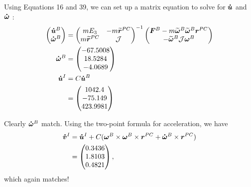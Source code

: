 \documentclass[12pt]{article}
\begin{document}
\begin{problem}[5]
Using Equations 16 and 39, we can set up a matrix equation to solve for $ {\bm{ \dot{u}}} $ and $ {\bm{ \dot{\omega}}} $ :
\begin{align*}
	\begin{pmatrix} {\bm{ \dot{u}}}^{B}\\ {\bm{ \dot{\omega}}}^{B}   \end{pmatrix} &= \begin{pmatrix} m E_3& -m {\bm{ \widetilde{ r}}}^{PC} \\ m {\bm{ \widetilde{ r}}}^{PC} & \mathcal{ J}  \end{pmatrix}^{-1} \begin{pmatrix} {\bm{ F}}^{B} - m {\bm{ \widetilde{ \omega}}}^{B} {\bm{ \widetilde{ \omega}}}^{B} {\bm{ r}}^{PC} \\ - {\bm{ \widetilde{ \omega}}}^{B} \mathcal{ J} {\bm{ \omega}}^{B}     \end{pmatrix}   \\ 
	{\bm{ \dot{\omega}}}^{B} &= \begin{pmatrix} -67.5008\\18.5284\\-4.0689 \end{pmatrix}  \\ 
	{\bm{ \dot{u}}}^{I} &= C {\bm{ \dot{u}}}^{B}  \\
	&= \begin{pmatrix} 1042.4\\-75.149\\423.9981 \end{pmatrix}  
\end{align*}
\end{problem}

\begin{problem}[6]
Clearly $ {\bm{ \dot{\omega}}}^{B} $ match. Using the two-point formula for acceleration, we have
\begin{align*}
	{\bm{ \dot{v}}}^{I} &= {\bm{ \dot{u}}}^{I} + C( {\bm{ \omega}}^{B} \times {\bm{ \omega}}^{B} \times  {\bm{ r}}^{PC} + {\bm{ \dot{\omega}}}^{B} \times {\bm{ r}}^{PC}  )  \\ 
	&= \begin{pmatrix} 0.3436\\1.8103\\0.4821 \end{pmatrix} , 
\end{align*}
which again matches!
\end{problem}
\end{document}
